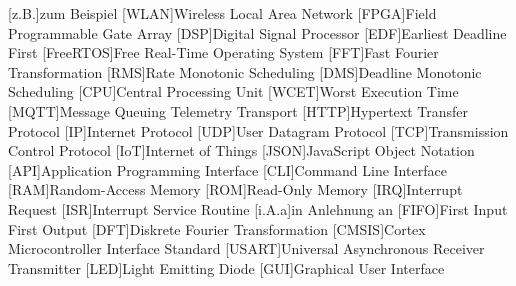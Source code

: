 \documentclass[../EDF Master Thesis.tex]{subfiles}
\begin{document}
    \begin{acronym}[abkuerzungen]
        [z.B.]{zum Beispiel}
        [WLAN]{Wireless Local Area Network}
        [FPGA]{Field Programmable Gate Array}
        [DSP]{Digital Signal Processor}
        [EDF]{Earliest Deadline First}
        [FreeRTOS]{Free Real-Time Operating System}
        [FFT]{Fast Fourier Transformation}
        [RMS]{Rate Monotonic Scheduling}
        [DMS]{Deadline Monotonic Scheduling}
        [CPU]{Central Processing Unit}
        [WCET]{Worst Execution Time}
        [MQTT]{Message Queuing Telemetry Transport}
        [HTTP]{Hypertext Transfer Protocol}
        [IP]{Internet Protocol}
        [UDP]{User Datagram Protocol}
        [TCP]{Transmission Control Protocol}
        [IoT]{Internet of Things}
        [JSON]{JavaScript Object Notation}
        [API]{Application Programming Interface}
        [CLI]{Command Line Interface}
        [RAM]{Random-Access Memory}
        [ROM]{Read-Only Memory}
        [IRQ]{Interrupt Request}
        [ISR]{Interrupt Service Routine}
        [i.A.a]{in Anlehnung an}
        [FIFO]{First Input First Output}
        [DFT]{Diskrete Fourier Transformation}
        [CMSIS]{Cortex Microcontroller Interface Standard}
        [USART]{Universal Asynchronous Receiver Transmitter}
        [LED]{Light Emitting Diode}
        [GUI]{Graphical User Interface}
	\end{acronym}
\end{document}
